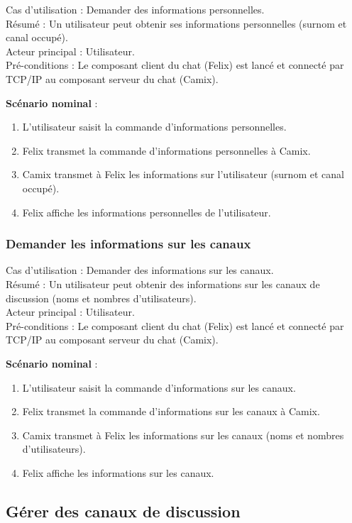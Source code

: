\noindent
Cas d'utilisation : Demander des informations personnelles.\\
Résumé : Un utilisateur peut obtenir ses informations personnelles (surnom et canal occupé). \\
Acteur principal : Utilisateur.\\
Pré-conditions : Le composant client du chat (Felix) est lancé et connecté par TCP/IP au composant serveur du chat (Camix).

\medskip
\textbf{Scénario nominal} :
\begin{enumerate}
\item L'utilisateur saisit la commande d'informations personnelles.
\item Felix transmet la commande d'informations personnelles à Camix.
\item Camix transmet à Felix les informations sur l'utilisateur (surnom et canal occupé).
\item Felix affiche les informations personnelles de l'utilisateur.
\end{enumerate}

\subsubsection{Demander les informations sur les canaux}
\label{sec:cu:informations:canaux}

\noindent
Cas d'utilisation : Demander des informations sur les canaux.\\
Résumé : Un utilisateur peut obtenir des informations sur les canaux de discussion (noms et nombres d'utilisateurs). \\
Acteur principal : Utilisateur.\\
Pré-conditions : Le composant client du chat (Felix) est lancé et connecté par TCP/IP au composant serveur du chat (Camix).

\medskip
\textbf{Scénario nominal} :
\begin{enumerate}
\item L'utilisateur saisit la commande d'informations sur les canaux.
\item Felix transmet la commande d'informations sur les canaux à Camix.
\item Camix transmet à Felix les informations sur les canaux (noms et nombres d'utilisateurs).
\item Felix affiche les informations sur les canaux.
\end{enumerate}

\subsection{Gérer des canaux de discussion}
\label{sec:cu:canaux}

